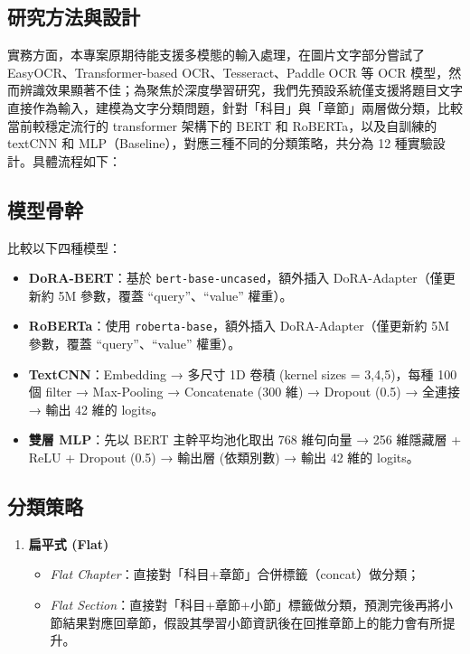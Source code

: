 \documentclass[10pt,conference]{IEEEtran}
\begin{document}
\begin{CJK}{UTF8}{bsmi}
\section{研究方法與設計}
實務方面，本專案原期待能支援多模態的輸入處理，在圖片文字部分嘗試了 EasyOCR、Transformer-based OCR、Tesseract、Paddle OCR 等 OCR 模型，然而辨識效果顯著不佳；為聚焦於深度學習研究，我們先預設系統僅支援將題目文字直接作為輸入，建模為文字分類問題，針對「科目」與「章節」兩層做分類，比較當前較穩定流行的 transformer 架構下的 BERT 和 RoBERTa，以及自訓練的 textCNN 和 MLP（Baseline），對應三種不同的分類策略，共分為 12 種實驗設計。具體流程如下：

\subsection{模型骨幹}
比較以下四種模型：
\begin{itemize}
  \item \textbf{DoRA-BERT}：基於 \texttt{bert-base-uncased}，額外插入 DoRA-Adapter（僅更新約 5M 參數，覆蓋 “query”、“value” 權重）。  
  \item \textbf{RoBERTa}：使用 \texttt{roberta-base}，額外插入 DoRA-Adapter（僅更新約 5M 參數，覆蓋 “query”、“value” 權重）。 
  \item \textbf{TextCNN}：Embedding → 多尺寸 1D 卷積 (kernel sizes = 3,4,5)，每種 100 個 filter → Max-Pooling → Concatenate (300 維) → Dropout (0.5) → 全連接 → 輸出 42 維的 logits。  
  \item \textbf{雙層 MLP}：先以 BERT 主幹平均池化取出 768 維句向量 → 256 維隱藏層 + ReLU + Dropout (0.5) → 輸出層 (依類別數) → 輸出 42 維的 logits。  
\end{itemize}

\subsection{分類策略}
\begin{enumerate}
  \item \textbf{扁平式 (Flat)}  
    \begin{itemize}
      \item \emph{Flat Chapter}：直接對「科目+章節」合併標籤（concat）做分類；  
      \item \emph{Flat Section}：直接對「科目+章節+小節」標籤做分類，預測完後再將小節結果對應回章節，假設其學習小節資訊後在回推章節上的能力會有所提升。
    \end{itemize}


\end{enumerate}
\end{CJK}
\end{document}
